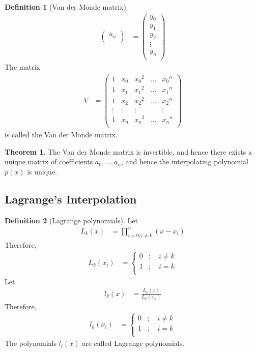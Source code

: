 \documentclass[fleqn, a4paper, 12pt, twoside]{article}
\theoremstyle{definition}
\newtheorem{definition}{Definition}
\theoremstyle{theorem}
\newtheorem{theorem}{Theorem}
\begin{document}
\begin{definition}[Van der Monde matrix]
\begin{align*}
\begin{pmatrix}
				a_n    \\
			\end{pmatrix}
		&=
			\begin{pmatrix}
				y_0    \\
				y_1    \\
				y_2    \\
				\vdots \\
				y_n    \\
			\end{pmatrix}
	\end{align*}
	The matrix
	\begin{align*}
		V &=
			\begin{pmatrix}
				1      & x_0    & {x_0}^2 & \dots & {x_0}^n \\
				1      & x_1    & {x_1}^2 & \dots & {x_1}^n \\
				1      & x_2    & {x_2}^2 & \dots & {x_2}^n \\
				\vdots & \vdots & \vdots  &       & \vdots  \\
				1      & x_n    & {x_n}^2 & \dots & {x_n}^n \\
			\end{pmatrix}
	\end{align*}
	is called the Van der Monde matrix.
\end{definition}

\begin{theorem}
	The Van der Monde matrix is invertible, and hence there exists a unique matrix of coefficients $a_0 , \dots , a_n$, and hence the interpolating polynomial $p(x)$ is unique.
\end{theorem}

\subsection{Lagrange's Interpolation}

\begin{definition}[Lagrange polynomials]
	Let
	\begin{align*}
		L_k(x) & = \prod\limits_{i = 0 ; i \neq k}^{n} (x - x_i)
	\end{align*}
	Therefore,
	\begin{align*}
		L_k(x_i) &=
			\begin{cases}
				0 & ;\quad i \neq k \\
				1 & ;\quad i = k    \\
			\end{cases}
	\end{align*}
	Let
	\begin{align*}
		l_k(x) & = \frac{L_k(x)}{L_k(x_k)}
	\end{align*}
	Therefore,
	\begin{align*}
		l_k(x_i) &=
			\begin{cases}
				0 & ;\quad i \neq k \\
				1 & ;\quad i = k    \\
			\end{cases}
	\end{align*}
	The polynomials $l_i(x)$ are called Lagrange polynomials.
\end{definition}
\end{document}
